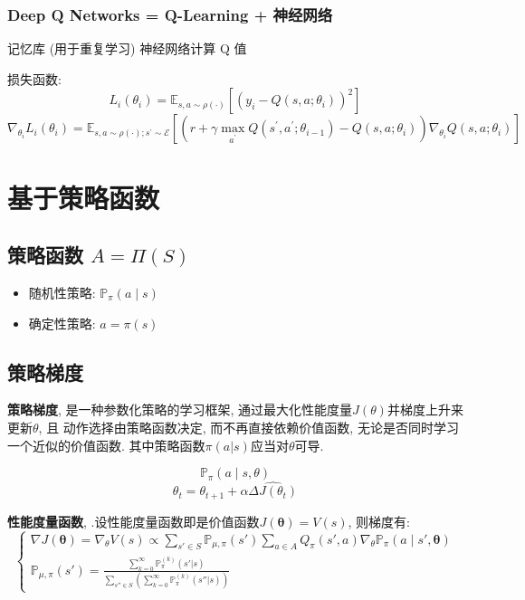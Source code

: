 \documentclass{article}
\begin{document}
    	\subsubsection{Deep Q Networks = Q-Learning + 神经网络}
    	    记忆库 (用于重复学习)
            神经网络计算 Q 值
    	
            损失函数:
                $$L_{i}\left(\theta_{i}\right)=\mathbb{E}_{s, a \sim \rho(\cdot)}\left[\left(y_{i}-Q\left(s, a ; \theta_{i}\right)\right)^{2}\right]$$
                $$\nabla_{\theta_{i}} L_{i}\left(\theta_{i}\right)=\mathbb{E}_{s, a \sim \rho(\cdot) ; s^{\prime} \sim \mathcal{E}}\left[\left(r+\gamma \max _{a^{\prime}} Q\left(s^{\prime}, a^{\prime} ; \theta_{i-1}\right)-Q\left(s, a ; \theta_{i}\right)\right) \nabla_{\theta_{i}} Q\left(s, a ; \theta_{i}\right)\right]$$

\section{基于策略函数}
    \subsection{策略函数 $A = \Pi(S)$}
        \begin{itemize}
            \item 随机性策略: $\mathbb{P}_\pi(a \mid s)$
            \item 确定性策略: $a = \pi(s)$
        \end{itemize}

    \subsection{策略梯度}
        \textbf{策略梯度}, 是一种参数化策略的学习框架, 通过最大化性能度量$J(\theta)$并梯度上升来更新$\theta$, 且 动作选择由策略函数决定, 而不再直接依赖价值函数, 无论是否同时学习一个近似的价值函数. 其中策略函数$\pi(a|s)$应当对$\theta$可导.
        
        $$\mathbb{P}_\pi (a \mid s, \theta)$$
        $$ \theta_t = \theta_{t+1} + \alpha  \widehat{\Delta J(\theta_t)}$$
        
        \textbf{性能度量函数}, .设性能度量函数即是价值函数$J(\boldsymbol{\theta}) = V(s)$, 则梯度有:
            $$\left\{ \begin{array}{l} \nabla J(\boldsymbol{\theta}) = \nabla_\theta V(s) \propto \sum\limits_{s' \in S} \mathbb P_{\mu, \pi}(s') \sum\limits_{a \in A} Q_{\pi}(s', a) \nabla_{\theta} \mathbb{P}_\pi(a \mid s', \boldsymbol{\theta}) \\ 
            \mathbb P_{\mu, \pi}(s') = \frac{\sum\limits_{k=0}^{\infty} \mathbb P_\pi^{(k)}\left(s'| s\right)}{\sum\limits_{s''\in S} \left(\sum\limits_{k=0}^{\infty} \mathbb P_\pi^{(k)}\left(s''| s\right)\right)} \end{array} \right.$$
        
\end{document}
